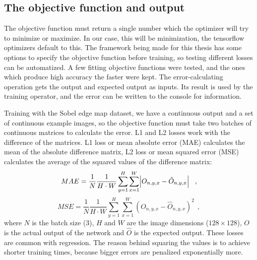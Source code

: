 \documentclass[12pt]{report}
\begin{document}
\subsection{The objective function and output}\label{f1loss}
The objective function must return a single number which the optimizer will try to minimize or maximize. In our case, this will be minimization, the tensorflow optimizers default to this. The framework being made for this thesis has some options to specify the objective function before training, so testing different losses can be automatized. A few fitting objective functions were tested, and the ones which produce high accuracy the faster were kept. The error-calculating operation gets the output and expected output as inputs. Its result is used by the training operator, and the error can be written to the console for information.

Training with the Sobel edge map dataset, we have a continuous output and a set of continuous example images, so the objective function must take two batches of continuous matrices to calculate the error. L1 and L2 losses work with the difference of the matrices. L1 loss or mean absolute error (MAE) calculates the mean of the absolute difference matrix, L2 loss or mean squared error (MSE) calculates the average of the squared values of the difference matrix:
\begin{equation*}
MAE = \frac{1}{N}\frac{1}{H\cdot W}\sum_{y=1}^{H}\sum_{x=1}^{W}\abs{O_{n,y,x}-\hat{O}_{n,y,x}}\ \ ,
\end{equation*}
\begin{equation*}
MSE = \frac{1}{N}\frac{1}{H\cdot W}\sum_{y=1}^{H}\sum_{x=1}^{W}\left(O_{n,y,x}-\hat{O}_{n,y,x}\right)^{2}\ \ ,
\end{equation*}
where $N$ is the batch size ($3$), $H$ and $W$ are the image dimensions ($128\times128$), $O$ is the actual output of the network and $\hat{O}$ is the expected output. These losses are common with regression. The reason behind squaring the values is to achieve shorter training times, because bigger errors are penalized exponentially more.
\end{document}
